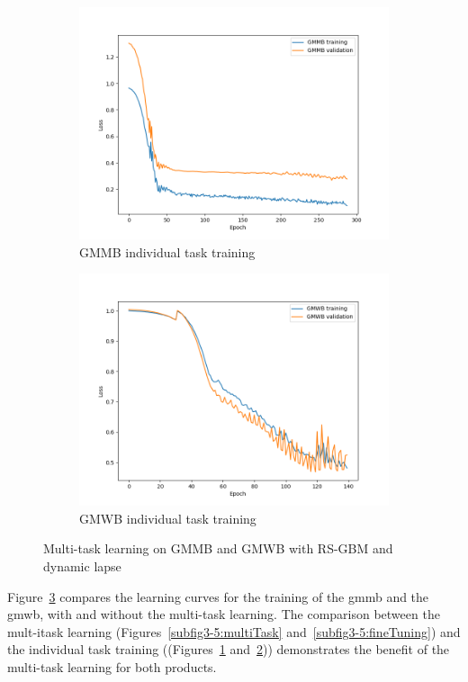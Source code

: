 \begin{figure}[ht!]
\begin{subfigure}{0.48\textwidth}
        \includegraphics[width=\textwidth]{./project3/figures/figure5c.png}
        \caption{GMMB individual task training} 
    \label{subfig3-5:gmmb_individual}
    \end{subfigure}\hfill
    \begin{subfigure}{0.48\textwidth}
        \includegraphics[width=\textwidth]{./project3/figures/figure5d.png}
        \caption{GMWB individual task training}
        \label{subfig3-5:gmwb_individual}
    \end{subfigure}
    \caption{Multi-task learning on GMMB and GMWB with RS-GBM and dynamic lapse}
    \label{fig3:figure5}
\end{figure}

Figure~\ref{fig3:figure5} compares the learning curves for the training of the \gls{gmmb} and the \gls{gmwb}, with and without the multi-task learning.
The comparison between the mult-itask learning (Figures~\ref{subfig3-5:multiTask} and~\ref{subfig3-5:fineTuning}) and the individual task training ((Figures~\ref{subfig3-5:gmmb_individual} and~\ref{subfig3-5:gmwb_individual})) demonstrates the benefit of the multi-task learning for both products. 

